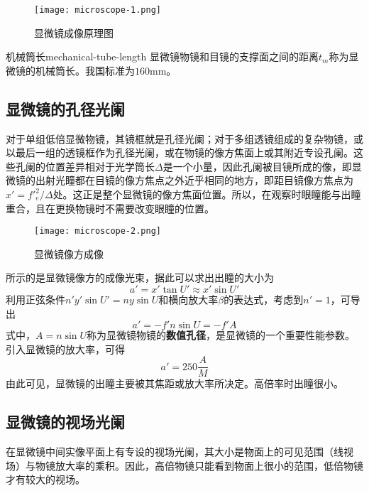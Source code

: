 \documentclass[cn,10pt,chinesefont=founder,math=newtx,cite=super,twoside]{elegantbook}
\begin{document}
\begin{figure}[htbp]
	\centering
	\texttt{[image: microscope-1.png]}
	\caption{显微镜成像原理图}
	\label{fig:microscope-1}
\end{figure}

\begin{definition}{机械筒长}{mechanical-tube-length}
	显微镜物镜和目镜的支撑面之间的距离$t_m$称为显微镜的机械筒长。我国标准为$160\mathrm{mm}$。
\end{definition}

\subsection{显微镜的孔径光阑}
对于单组低倍显微物镜，其镜框就是孔径光阑；对于多组透镜组成的复杂物镜，或以最后一组的透镜框作为孔径光阑，或在物镜的像方焦面上或其附近专设孔阑。这些孔阑的位置差异相对于光学筒长$\varDelta$是一个小量，因此孔阑被目镜所成的像，即显微镜的出射光瞳都在目镜的像方焦点之外近乎相同的地方，即距目镜像方焦点为$x'=f'^2_e/\varDelta$处。这正是整个显微镜的像方焦面位置。所以，在观察时眼瞳能与出瞳重合，且在更换物镜时不需要改变眼瞳的位置。

\begin{figure}[htbp]
	\centering
	\texttt{[image: microscope-2.png]}
	\caption{显微镜像方成像}
	\label{fig:microscope-2}
\end{figure}

 所示的是显微镜像方的成像光束，据此可以求出出瞳的大小为
\begin{equation}
a'=x'\tan U'\approx x'\sin U'
\end{equation}
利用正弦条件$n'y'\sin U'=ny\sin U$和横向放大率$\beta$的表达式，考虑到$n'=1$，可导出
\begin{equation}
a'=-f'n\sin U=-f'A
\end{equation}
式中，$A=n\sin U$称为显微镜物镜的\textbf{数值孔径}，是显微镜的一个重要性能参数。引入显微镜的放大率，可得
\begin{equation}
a'=250\frac{A}{M}
\end{equation}
由此可见，显微镜的出瞳主要被其焦距或放大率所决定。高倍率时出瞳很小。

\subsection{显微镜的视场光阑}
在显微镜中间实像平面上有专设的视场光阑，其大小是物面上的可见范围（线视场）与物镜放大率的乘积。因此，高倍物镜只能看到物面上很小的范围，低倍物镜才有较大的视场。
\end{document}
